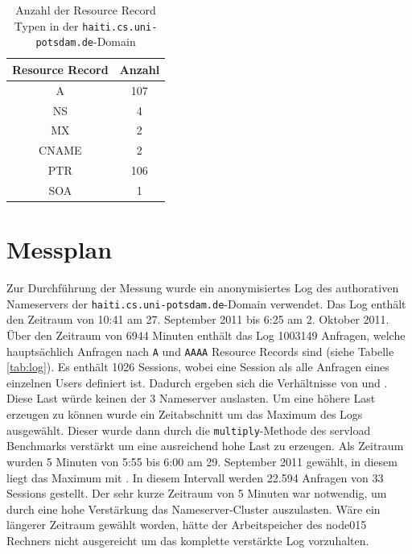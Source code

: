 \documentclass[a4paper, 12pt, BCOR10mm, DIV12, toc=bibliography, toc=listof, german]{scrbook}
\begin{document}
		\begin{table}
			\centering
			\begin{tabular}{|c|c|}\hline
				Resource Record & Anzahl \\\hline\hline
				A & 107 \\
				NS & 4 \\
				MX & 2 \\
				CNAME & 2 \\
				PTR & 106 \\
				SOA & 1 \\\hline
			\end{tabular}
			\caption{Anzahl der Resource Record Typen in der \texttt{haiti.cs.uni-potsdam.de}-Domain}
			\label{tab:rr-domain}
		\end{table}
			

		\section{Messplan} %
		\label{sec:messplan}

		Zur Durchführung der  Messung wurde ein anonymisiertes Log des authorativen Nameservers der  
		\texttt{haiti.cs.uni-potsdam.de}-Domain verwendet. Das Log enthält den Zeitraum von 10:41 am 27.
		September 2011 bis 6:25 am 2. Oktober 2011. Über den Zeitraum von 6944 Minuten enthält das Log
		1003149 Anfragen, welche hauptsächlich Anfragen nach \texttt{A} und \texttt{AAAA} Resource
		Records sind (siehe Tabelle \ref{tab:log}). Es enthält 1026 Sessions, wobei eine Session als
		alle Anfragen eines einzelnen Users definiert ist. Dadurch ergeben sich die Verhältnisse von
		\unit[9,33]{} und \unit[977,63]{}. Diese
		Last würde keinen der 3 Nameserver auslasten. Um eine höhere Last erzeugen zu können wurde ein
		Zeitabschnitt um das Maximum des Logs ausgewählt. Dieser wurde dann durch die
		\texttt{multiply}-Methode des servload Benchmarks verstärkt um eine ausreichend hohe Last zu
		erzeugen. Als Zeitraum wurden 5 Minuten von 5:55 bis 6:00 am 29. September 2011 gewählt, in
		diesem liegt das Maximum mit \unit[204]{}. In diesem Intervall
		werden 22.594 Anfragen von 33 Sessions gestellt. Der sehr kurze Zeitraum von 5 Minuten war
		notwendig, um durch eine hohe Verstärkung das Nameserver-Cluster auszulasten. Wäre ein
		längerer Zeitraum gewählt worden, hätte der Arbeitspeicher des node015 Rechners nicht
		ausgereicht um das komplette verstärkte Log vorzuhalten.
		
\end{document}
